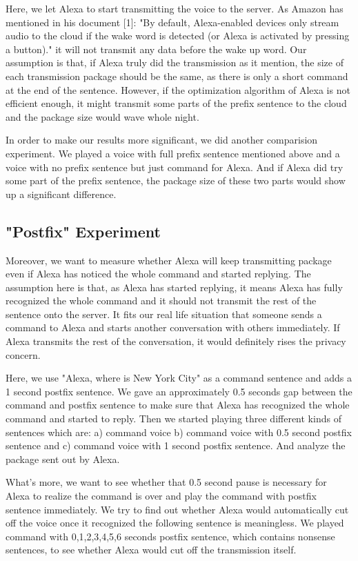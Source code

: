 Here, we let Alexa to start transmitting the voice to the server. As Amazon has mentioned in his document [1]: "By default, Alexa-enabled devices only stream audio to the cloud if the wake word is detected (or Alexa is activated by pressing a button)." it will not transmit any data before the wake up word. Our assumption is that, if Alexa truly did the transmission as it mention, the size of each transmission package should be the same, as there is only a short command at the end of the sentence. However, if the optimization algorithm of Alexa is not efficient enough, it might transmit some parts of the prefix sentence to the cloud and the package size would wave whole night.

In order to make our results more significant, we did another comparision experiment. We played a voice with full prefix sentence mentioned above and a voice with no prefix sentence but just command for Alexa. And if Alexa did try some part of the prefix sentence, the package size of these two parts would show up a significant difference.

\subsection{"Postfix" Experiment}
  
Moreover, we want to measure whether Alexa will keep transmitting package even if Alexa has noticed the whole command and started replying. The assumption here is that, as Alexa has started replying, it means Alexa has fully recognized the whole command and it should not transmit the rest of the sentence onto the server. It fits our real life situation that someone sends a command to Alexa and starts another conversation with others immediately. If Alexa transmits the rest of the conversation, it would definitely rises the privacy concern.

Here, we use "Alexa, where is New York City" as a command sentence and adds a 1 second postfix sentence. We gave an approximately 0.5 seconds gap between the command and postfix sentence to make sure that Alexa has recognized the whole command and started to reply. Then we started playing three different kinds of sentences which are: a) command voice b) command voice with 0.5 second postfix sentence and c) command voice with 1 second postfix sentence. And analyze the package sent out by Alexa.

What's more, we want to see whether that 0.5 second pause is necessary for Alexa to realize the command is over and play the command with postfix sentence immediately. We try to find out whether Alexa would automatically cut off the voice once it recognized the following sentence is meaningless. We played command with 0,1,2,3,4,5,6 seconds postfix sentence, which contains nonsense sentences, to see whether Alexa would cut off the transmission itself.

